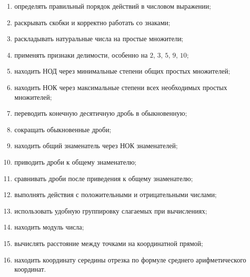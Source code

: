 \documentclass[a4paper,12pt]{article}
\begin{document}
\begin{enumerate}[label=\arabic*)]

  \item определять правильный порядок действий
  в числовом выражении;

  \item раскрывать скобки и корректно работать
  со знаками;

  \item раскладывать натуральные числа
  на простые множители;

  \item применять признаки делимости,
  особенно на $2$, $3$, $5$, $9$, $10$;

  \item находить НОД через минимальные степени
  общих простых множителей;

  \item находить НОК через максимальные степени
  всех необходимых простых множителей;

  \item переводить конечную десятичную дробь
  в обыкновенную;

  \item сокращать обыкновенные дроби;

  \item находить общий знаменатель через НОК
  знаменателей;

  \item приводить дроби к общему знаменателю;

  \item сравнивать дроби после приведения
  к общему знаменателю;

  \item выполнять действия с положительными
  и отрицательными числами;

  \item использовать удобную группировку
  слагаемых при вычислениях;

  \item находить модуль числа;

  \item вычислять расстояние между точками
  на координатной прямой;

  \item находить координату середины отрезка
  по формуле среднего арифметического координат.

\end{enumerate}

\end{document}
